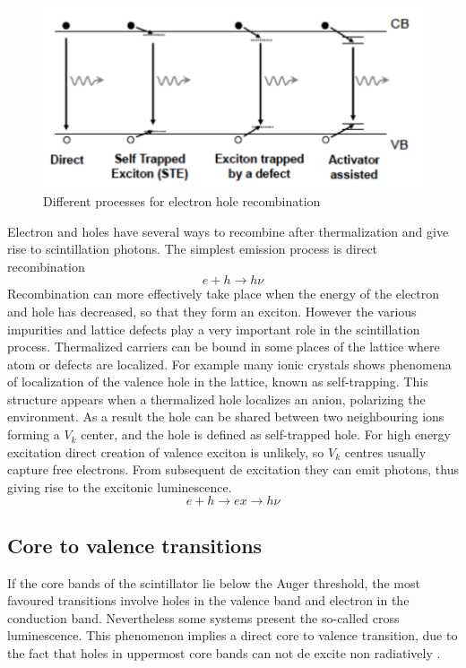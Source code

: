 \begin{figure}
\centering
\includegraphics[width=12cm]{../Pictures/Chapter_2/traps.pdf}
\caption[Electron hole recombination]{Different processes for electron hole recombination}
\label{fig:traps}
\end{figure}
Electron and holes have several ways to recombine after thermalization and give rise to scintillation photons.
The simplest emission process is direct recombination
\begin{equation}
e + h \rightarrow h\nu
\end{equation}
Recombination can more effectively take place when the energy of the electron and hole has decreased, so that they form an exciton. 
However the various impurities and lattice defects play a very important role in the scintillation process. Thermalized carriers can be bound in some places of the lattice where atom or defects are localized. 
For example many ionic crystals shows phenomena of localization of the valence hole in the lattice, known as self-trapping. This structure appears when a thermalized hole localizes an anion, polarizing the environment. As a result the hole can be shared between two neighbouring ions forming a $V_{k}$ center, and the hole is defined as self-trapped hole. For high energy excitation direct creation of valence exciton is unlikely, so $V_{k}$ centres usually capture free electrons. From subsequent de excitation they can emit photons, thus giving rise to the excitonic luminescence.
\begin{equation} 
e + h \rightarrow ex \rightarrow h\nu
\end{equation}

\subsection{Core to valence transitions}

If the core bands of the scintillator lie below the Auger threshold, the most favoured transitions involve holes in the valence band and electron in the conduction band. Nevertheless some systems present the so-called cross luminescence. This phenomenon implies a direct core to valence transition, due to the fact that holes in uppermost core bands can not de excite non radiatively \cite{Lecoq2006}. 

